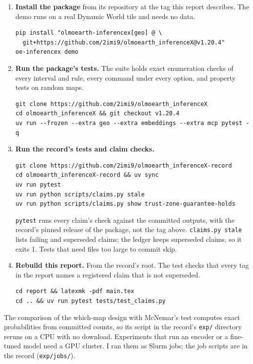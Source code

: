 \documentclass[11pt,a4paper]{article}
\newcommand{\code}[1]{\texttt{#1}}
\begin{document}
\begin{enumerate}
\item \textbf{Install the package} from its repository at the tag this report describes. The demo runs on a real
  Dynamic World tile and needs no data.
\begin{verbatim}
pip install "olmoearth-inferencex[geo] @ \
  git+https://github.com/2imi9/olmoearth_inferenceX@v1.20.4"
oe-inferencex demo
\end{verbatim}

\item \textbf{Run the package's tests.} The suite holds exact enumeration checks of every interval and rule, every
  command under every option, and property tests on random maps.
\begin{verbatim}
git clone https://github.com/2imi9/olmoearth_inferenceX
cd olmoearth_inferenceX && git checkout v1.20.4
uv run --frozen --extra geo --extra embeddings --extra mcp pytest -q
\end{verbatim}

\item \textbf{Run the record's tests and claim checks.}
\begin{verbatim}
git clone https://github.com/2imi9/olmoearth_inferenceX-record
cd olmoearth_inferenceX-record && uv sync
uv run pytest
uv run python scripts/claims.py stale
uv run python scripts/claims.py show trust-zone-guarantee-holds
\end{verbatim}
  \code{pytest} runs every claim's check against the committed outputs, with the record's pinned release of the
  package, not the tag above. \code{claims.py stale} lists failing and superseded claims; the ledger keeps superseded
  claims, so it exits 1. Tests that need files too large to commit skip.

\item \textbf{Rebuild this report.} From the record's root. The test checks that every tag in the report names a
  registered claim that is not superseded.
\begin{verbatim}
cd report && latexmk -pdf main.tex
cd .. && uv run pytest tests/test_claims.py
\end{verbatim}

\end{enumerate}

The comparison of the which-map design with McNemar's test computes exact probabilities from committed counts, so
its script in the record's \code{exp/} directory reruns on a CPU with no download. Experiments that run an encoder
or a fine-tuned model need a GPU cluster. I ran them as Slurm jobs; the job scripts are in the record
(\code{exp/jobs/}).
\end{document}
